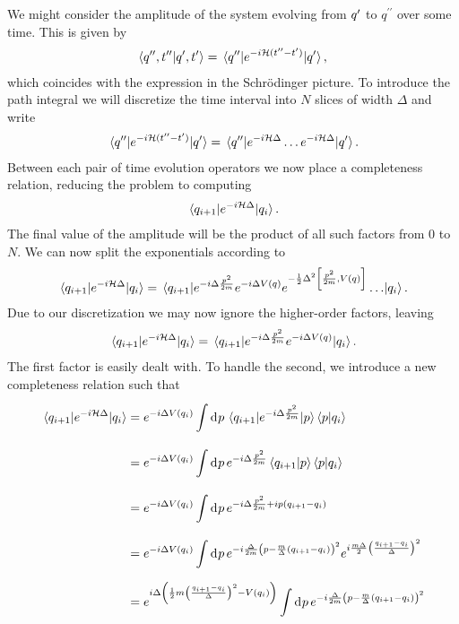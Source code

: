 We might consider the amplitude of the system evolving from $q^{\prime}$ to $q^{\prime\prime}$ over some time. This is given by
\begin{align*}
	\braket{q^{\prime\prime}, t^{\prime\prime}}{q^{\prime}, t^{\prime}} = \mel{q^{\prime\prime}}{e^{-i\ensuremath{\mathcal{H}}(t^{\prime\prime} - t\ensuremath{^{\prime}})}}{q\ensuremath{^{\prime}}},
\end{align*}
which coincides with the expression in the Schrödinger picture. To introduce the path integral we will discretize the time interval into $N$ slices of width $\Delta$ and write
\begin{align*}
	\mel{q^{\prime\prime}}{e^{-i\ensuremath{\mathcal{H}}(t^{\prime\prime} - t\ensuremath{^{\prime}})}}{q\ensuremath{^{\prime}}} = \mel{q^{\prime\prime}}{e^{-i\ensuremath{\mathcal{H}}\Delta}\dots e^{-i\ensuremath{\mathcal{H}}\Delta}}{q\ensuremath{^{\prime}}}.
\end{align*}
Between each pair of time evolution operators we now place a completeness relation, reducing the problem to computing
\begin{align*}
	\mel{q_{i + 1}}{e^{-i\ensuremath{\mathcal{H}}\Delta}}{q_{i}}.
\end{align*}
The final value of the amplitude will be the product of all such factors from $0$ to $N$. We can now split the exponentials according to
\begin{align*}
	\mel{q_{i + 1}}{e^{-i\ham\Delta}}{q_{i}} = \mel{q_{i + 1}}{e^{-i\Delta\frac{p^{2}}{2m}}e^{-i\Delta V(q)}e^{-\frac{1}{2}\Delta^{2}\comm{\frac{p^{2}}{2m}}{V(q)}}\dots}{q_{i}}.
\end{align*}
Due to our discretization we may now ignore the higher-order factors, leaving
\begin{align*}
	\mel{q_{i + 1}}{e^{-i\ensuremath{\mathcal{H}}\Delta}}{q_{i}} = \mel{q_{i + 1}}{e^{-i\Delta\frac{p^{2}}{2m}}e^{-i\Delta V(q)}}{q_{i}}.
\end{align*}
The first factor is easily dealt with. To handle the second, we introduce a new completeness relation such that
\begin{align*}
	\mel{q_{i + 1}}{e^{-i\ensuremath{\mathcal{H}}\Delta}}{q_{i}} &= e^{-i\Delta V(q_{i})}\int\limits_{}^{}\dd[]{p}\mel{q_{i + 1}}{e^{-i\Delta\frac{p^{2}}{2m}}}{p}\braket{p}{q_{i}} \\
	                                         &= e^{-i\Delta V(q_{i})}\int\limits_{}^{}\dd[]{p}e^{-i\Delta\frac{p^{2}}{2m}}\braket{q_{i + 1}}{p}\braket{p}{q_{i}} \\
	                                         &= e^{-i\Delta V(q_{i})}\int\limits_{}^{}\dd[]{p}e^{-i\Delta\frac{p^{2}}{2m} + ip(q_{i + 1} - q_{i})} \\
	                                         &= e^{-i\Delta V(q_{i})}\int\limits_{}^{}\dd[]{p}e^{-i\frac{\Delta}{2m}\left(p - \frac{m}{\Delta}(q_{i + 1} - q_{i})\right)^{2}}e^{i\frac{m\Delta}{2}\left(\frac{q_{i + 1} - q_{i}}{\Delta}\right)^{2}} \\
	                                         &= e^{i\Delta\left(\frac{1}{2}m\left(\frac{q_{i + 1} - q_{i}}{\Delta}\right)^{2} - V(q_{i})\right)}\int\limits_{}^{}\dd[]{p}e^{-i\frac{\Delta}{2m}\left(p - \frac{m}{\Delta}(q_{i + 1} - q_{i})\right)^{2}}
\end{align*}
